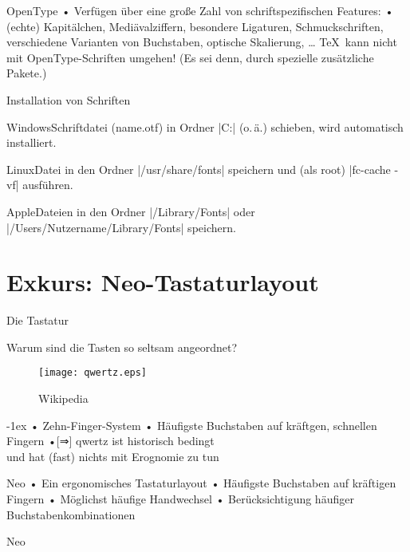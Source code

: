 \begin{frame}{OpenType}
• Verfügen über eine große Zahl von schriftspezifischen Features:
• (echte) Kapitälchen, Mediävalziffern, besondere Ligaturen, Schmuckschriften, verschiedene Varianten von Buchstaben, optische Skalierung, …
\•
\pause
\TeX\ kann nicht mit OpenType-Schriften umgehen! (Es sei denn, durch spezielle zusätzliche Pakete.)
\end{frame}

\begin{frame}[fragile]{Installation von Schriften}
\begin{block}{Windows}Schriftdatei (name.otf) in Ordner |C:\WINDOWS\Fonts| (o.\,ä.) schieben, wird automatisch installiert.
\end{block}
\begin{block}{Linux}Datei in den Ordner |/usr/share/fonts| speichern und (als root) |fc-cache -vf| ausführen.
\end{block}
\begin{block}{Apple}Dateien in den Ordner |/Library/Fonts| oder |/Users/Nutzername/Library/Fonts| speichern.
\end{block}
\end{frame}

\section{Exkurs: Neo-Tastaturlayout}
\begin{frame}{Die Tastatur}
\centerline{Warum sind die Tasten so seltsam angeordnet?}
\begin{figure}
\texttt{[image: qwertz.eps]}
\caption{ Wikipedia}
\end{figure}
\pause\kern-1ex
• Zehn-Finger-System
• Häufigste Buchstaben auf kräftgen, schnellen Fingern%
\pause%
•[⇒] \alert{qwertz ist historisch bedingt\\ und hat (fast) nichts mit Erognomie zu tun}
\• 
\end{frame}

\begin{frame}{Neo}
• Ein ergonomisches Tastaturlayout
• Häufigste Buchstaben auf kräftigen Fingern
• Möglichst häufige Handwechsel
• Berücksichtigung häufiger Buchstabenkombinationen
\•
\end{frame}

\begin{frame}{Neo}
\begin{figure}
\end{figure}
\end{frame}

